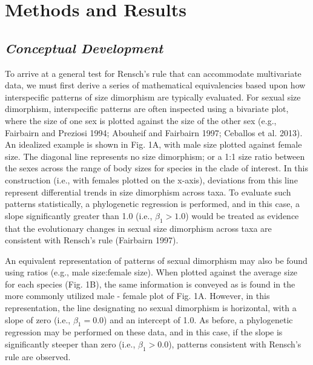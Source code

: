 \documentclass[]{article}
\begin{document}
\section{Methods and Results}\label{methods-and-results}

\subsection{\texorpdfstring{\emph{Conceptual
Development}}{Conceptual Development}}\label{conceptual-development}

To arrive at a general test for Rensch's rule that can accommodate
multivariate data, we must first derive a series of mathematical
equivalencies based upon how interspecific patterns of size dimorphism
are typically evaluated. For sexual size dimorphism, interspecific
patterns are often inspected using a bivariate plot, where the size of
one sex is plotted against the size of the other sex (e.g., Fairbairn
and Preziosi 1994; Abouheif and Fairbairn 1997; Ceballos et al. 2013).
An idealized example is shown in Fig. 1A, with male size plotted against
female size. The diagonal line represents no size dimorphism; or a 1:1
size ratio between the sexes across the range of body sizes for species
in the clade of interest. In this construction (i.e., with females
plotted on the x-axis), deviations from this line represent differential
trends in size dimorphism across taxa. To evaluate such patterns
statistically, a phylogenetic regression is performed, and in this case,
a slope significantly greater than 1.0 (i.e., \(\beta_{1}>1.0\)) would
be treated as evidence that the evolutionary changes in sexual size
dimorphism across taxa are consistent with Rensch's rule (Fairbairn
1997). \hfill\break

An equivalent representation of patterns of sexual dimorphism may also
be found using ratios (e.g., male size:female size). When plotted
against the average size for each species (Fig. 1B), the same
information is conveyed as is found in the more commonly utilized male -
female plot of Fig. 1A. However, in this representation, the line
designating no sexual dimorphism is horizontal, with a slope of zero
(i.e., \(\beta_{1}=0.0\)) and an intercept of 1.0. As before, a
phylogenetic regression may be performed on these data, and in this
case, if the slope is significantly steeper than zero (i.e.,
\(\beta_{1}>0.0\)), patterns consistent with Rensch's rule are observed.
\hfill\break
\end{document}
